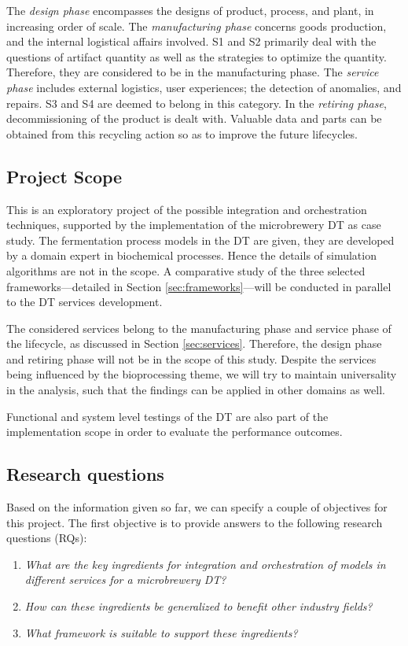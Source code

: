 \documentclass[journal,onecolumn]{IEEEtran} %
\begin{document}
The \textit{design phase} encompasses the designs of product, process, and plant, in increasing order of scale. The \textit{manufacturing phase} concerns goods production, and the internal logistical affairs involved. S1 and S2 primarily deal with the questions of artifact quantity as well as the strategies to optimize the quantity. Therefore, they are considered to be in the manufacturing phase. The \textit{service phase} includes external logistics, user experiences; the detection of anomalies, and repairs. S3 and S4 are deemed to belong in this category. In the \textit{retiring phase}, decommissioning of the product is dealt with. Valuable data and parts can be obtained from this recycling action so as to improve the future lifecycles.

\subsection{Project Scope}\label{sec:scope}
This is an exploratory project of the possible integration and orchestration techniques, supported by the implementation of the microbrewery DT as case study. The fermentation process models in the DT are given, they are developed by a domain expert in biochemical processes. Hence the details of simulation algorithms are not in the scope. A comparative study of the three selected frameworks---detailed in Section \ref{sec:frameworks}---will be conducted in parallel to the DT services development. 

The considered services belong to the manufacturing phase and service phase of the lifecycle, as discussed in Section \ref{sec:services}. Therefore, the design phase and retiring phase will not be in the scope of this study. Despite the services being influenced by the bioprocessing theme, we will try to maintain universality in the analysis, such that the findings can be applied in other domains as well.

Functional and system level testings of the DT are also part of the implementation scope in order to evaluate the performance outcomes.

\subsection{Research questions}\label{sec:rqs}
Based on the information given so far, we can specify a couple of objectives for this project. The first objective is to provide answers to the following research questions (RQs):

\begin{enumerate}
  \item \textit{What are the key ingredients for integration and orchestration of models in different services for a microbrewery DT?}
  \item \textit{How can these ingredients be generalized to benefit other industry fields? }
  \item \textit{What framework is suitable to support these ingredients?}  
  
\end{enumerate}
\end{document}
